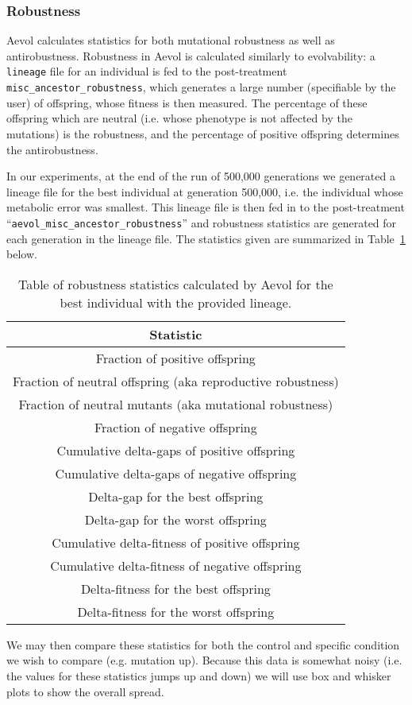 \subsubsection{Robustness}
Aevol calculates statistics for both mutational robustness as well as antirobustness. Robustness in Aevol is calculated similarly to evolvability: a \texttt{lineage} file for an individual is fed to the post-treatment \texttt{misc\_ancestor\_robustness}, which generates a large number (specifiable by the user) of offspring, whose fitness is then measured. The percentage of these offspring which are neutral (i.e. whose phenotype is not affected by the mutations) is the robustness, and the percentage of positive offspring determines the antirobustness.

In our experiments, at the end of the run of 500,000 generations we generated a lineage file for the best individual at generation 500,000, i.e. the individual whose metabolic error was smallest. This lineage file is then fed in to the post-treatment ``\texttt{aevol\_misc\_ancestor\_robustness}'' and robustness statistics are generated for each generation in the lineage file. The statistics given are summarized in Table~\ref{table:robustness} below.
\begin{table}[H]
	\centering
	\begin{tabular}{||c||}
		\hline
		\textbf{Statistic} \\
		\hline \hline
		Fraction of positive offspring \\
		\hline
		Fraction of neutral offspring (aka reproductive robustness) \\
		\hline
		Fraction of neutral mutants (aka mutational robustness) \\
		\hline
		Fraction of negative offspring \\
		\hline
		Cumulative delta-gaps of positive offspring \\
		\hline
		Cumulative delta-gaps of negative offspring \\
		\hline
		Delta-gap for the best offspring \\
		\hline
		Delta-gap for the worst offspring \\
		\hline
		Cumulative delta-fitness of positive offspring \\
		\hline
		Cumulative delta-fitness of negative offspring \\
		\hline
		Delta-fitness for the best offspring \\
		\hline
		Delta-fitness for the worst offspring \\
		\hline
		
	\end{tabular}
	\caption[Aevol robustness statistics]{Table of robustness statistics calculated by Aevol for the best individual with the provided lineage.}
	\label{table:robustness}
\end{table}
We may then compare these statistics for both the control and specific condition we wish to compare (e.g. mutation up). Because this data is somewhat noisy (i.e. the values for these statistics jumps up and down) we will use box and whisker plots to show the overall spread. 
